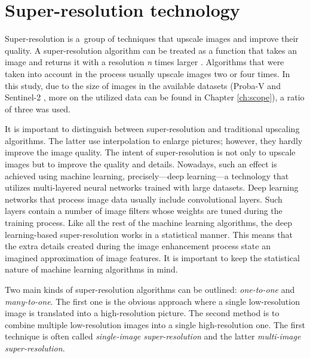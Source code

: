 \section{Super-resolution technology}
Super-resolution is a~group of techniques that upscale images and improve
their quality.
A super-resolution algorithm can be treated as a function that takes an image and returns
it with a resolution \textit{n} times larger \cite{wang-2019-srsurvey}.
Algorithms that were taken into account in the process usually upscale images two or four times.
In this study, due to the size of images in the available datasets (Proba-V \cite{esa-proba} and Sentinel-2 \cite{esa-sentinel}, more on the utilized data can be found in Chapter \ref{ch:scope}), a ratio of three was used.

It is important to distinguish between super-resolution and traditional
upscaling algorithms.
The latter use interpolation to enlarge pictures; however, they hardly improve the image quality.
The intent of super-resolution is not only to upscale images but to improve
the quality and details.
Nowadays, such an effect is achieved using machine learning, precisely---deep
learning---a technology that utilizes multi-layered neural networks trained
with large datasets.
Deep learning networks that process image data usually include convolutional
layers.
Such layers contain a number of image filters whose weights are tuned during the training process.
Like all the rest of the machine learning algorithms, the deep learning-based
super-resolution works in a statistical manner.
This means that the extra details created during the image enhancement process
state an imagined approximation of image features.
It is important to keep the statistical nature of machine learning algorithms
in mind.

Two main kinds of super-resolution algorithms can be outlined:
\textit{one-to-one} and \textit{many-to-one}.
The first one is the obvious approach where a single low-resolution image is
translated into a high-resolution picture.
The second method is to combine multiple low-resolution images into a single high-resolution one.
The first technique is often called \textit{single-image super-resolution} and the latter \textit{multi-image super-resolution}.

